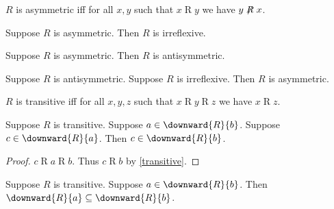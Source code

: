 \begin{definition}\label{asymmetric}
    $R$ is asymmetric iff
    for all $x, y$ such that
    $x\mathrel{R} y$ we have $y\not\mathrel{R}x$.
\end{definition}

\begin{proposition}\label{asymmetric_implies_irreflexive}
    Suppose $R$ is asymmetric.
    Then $R$ is irreflexive.
\end{proposition}

\begin{proposition}\label{asymmetric_implies_antisymmetric}
    Suppose $R$ is asymmetric.
    Then $R$ is antisymmetric.
\end{proposition}

\begin{proposition}\label{antisymmetric_and_irreflexive_implies_asymmetric}
    Suppose $R$ is antisymmetric.
    Suppose $R$ is irreflexive.
    Then $R$ is asymmetric.
\end{proposition}


\begin{definition}[Transitivity]\label{transitive}
    $R$ is transitive iff
    for all $x, y, z$ such that $x\mathrel{R}y\mathrel{R}z$
        we have $x\mathrel{R} z$.
\end{definition}

\begin{proposition}\label{transitive_downward_elem}
    Suppose $R$ is transitive.
    Suppose $a\in\downward{R}{b}$.
    Suppose $c\in\downward{R}{a}$.
    Then $c\in \downward{R}{b}$.
\end{proposition}
\begin{proof}
    $c\mathrel{R} a\mathrel{R}b$.
    Thus $c\mathrel{R} b$ by \cref{transitive}.
\end{proof}

\begin{proposition}\label{transitive_downward_subseteq}
    Suppose $R$ is transitive.
    Suppose $a\in\downward{R}{b}$.
    Then $\downward{R}{a}\subseteq \downward{R}{b}$.
\end{proposition}

